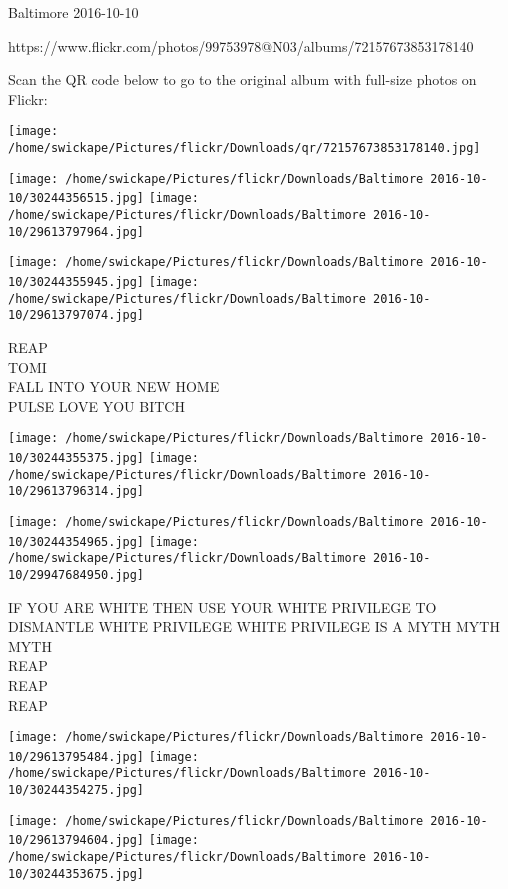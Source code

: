\documentclass[10pt,letterpaper]{article}
\begin{document}
Baltimore 2016-10-10

https://www.flickr.com/photos/99753978@N03/albums/72157673853178140

Scan the QR code below to go to the original album with full-size photos on Flickr:

\texttt{[image: /home/swickape/Pictures/flickr/Downloads/qr/72157673853178140.jpg]}
\pagebreak

\texttt{[image: /home/swickape/Pictures/flickr/Downloads/Baltimore 2016-10-10/30244356515.jpg]}
\texttt{[image: /home/swickape/Pictures/flickr/Downloads/Baltimore 2016-10-10/29613797964.jpg]}

\texttt{[image: /home/swickape/Pictures/flickr/Downloads/Baltimore 2016-10-10/30244355945.jpg]}
\texttt{[image: /home/swickape/Pictures/flickr/Downloads/Baltimore 2016-10-10/29613797074.jpg]}

REAP\\
TOMI\\
FALL INTO YOUR NEW HOME\\
PULSE LOVE YOU BITCH\\
\pagebreak

\texttt{[image: /home/swickape/Pictures/flickr/Downloads/Baltimore 2016-10-10/30244355375.jpg]}
\texttt{[image: /home/swickape/Pictures/flickr/Downloads/Baltimore 2016-10-10/29613796314.jpg]}

\texttt{[image: /home/swickape/Pictures/flickr/Downloads/Baltimore 2016-10-10/30244354965.jpg]}
\texttt{[image: /home/swickape/Pictures/flickr/Downloads/Baltimore 2016-10-10/29947684950.jpg]}

IF YOU ARE WHITE THEN USE YOUR WHITE PRIVILEGE TO DISMANTLE WHITE PRIVILEGE WHITE PRIVILEGE IS A MYTH MYTH MYTH\\
REAP\\
REAP\\
REAP\\
\pagebreak

\texttt{[image: /home/swickape/Pictures/flickr/Downloads/Baltimore 2016-10-10/29613795484.jpg]}
\texttt{[image: /home/swickape/Pictures/flickr/Downloads/Baltimore 2016-10-10/30244354275.jpg]}

\texttt{[image: /home/swickape/Pictures/flickr/Downloads/Baltimore 2016-10-10/29613794604.jpg]}
\texttt{[image: /home/swickape/Pictures/flickr/Downloads/Baltimore 2016-10-10/30244353675.jpg]}
\end{document}
